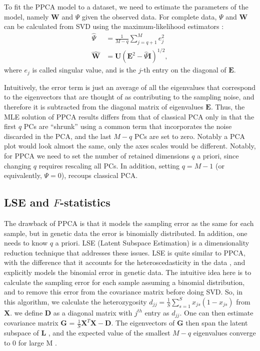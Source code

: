 \documentclass[12pt]{article}
\newcommand{\BI}{\mathbf{I}}
\newcommand{\MX}{\mathbf{X}}
\newcommand{\MG}{\mathbf{G}}
\begin{document}
To fit the PPCA model to a dataset, we need to estimate the parameters of the model, namely $\mathbf{W}$ and $\Psi$ given the observed data. For complete data, $\Psi$ and $\mathbf{W}$ can be calculated from SVD using the maximum-likelihood estimators \cite{tipping_probabilistic_1999}:
\begin{align*}
    \hat{\Psi} &= \frac{1}{M-q}\sum_{j=q+1}^M e_{j}^2\\
    \hat{\mathbf{W}} &= \mathbf{U}(\mathbf{E}^2 - \hat{\Psi}\BI)^{1/2},
\end{align*}
where $e_j$ is called singular value, and is the $j$-th entry on the diagonal of $\mathbf{E}$.

Intuitively, the error term is just an average of all the eigenvalues that correspond to the eigenvectors that are thought of as contributing to the sampling noise, and therefore it is subtracted from the diagonal matrix of eigenvalues $\mathbf{E}$. Thus, the MLE solution of PPCA results differs from that of classical PCA only in that the first $q$ PCs are ``shrunk'' using a common term that incorporates the noise discarded in the PCA, and the last $M-q$ PCs are set to zero. Notably a PCA plot would look almost the same, only the axes scales would be different. Notably, for PPCA we need to set the number of retained dimensions $q$ a priori, since changing $q$ requires rescaling all PCs. In addition, setting $q=M-1$ (or equivalently, $\Psi=0$), recoups classical PCA.


\subsection{LSE and $F$-statistics}\label{theory-lse}
The drawback of PPCA is that it models the sampling error as the same for each sample, but in genetic data the error is binomially distributed. In addition, one needs to know $q$ a priori. LSE (Latent Subspace Estimation) is a dimensionality reduction technique that addresses these issues. LSE is quite similar to PPCA, with the difference that it accounts for the heteroscedasticity in the data \citep{chen_consistent_2015}, and explicitly models the binomial error in genetic data. The intuitive idea here is to calculate the sampling error for each sample assuming a binomial distribution, and to remove this error from the covariance matrix before doing SVD. So, in this algorithm, we calculate the heterozygosity  $d_{jj} = \frac{1}{S}\sum_{s=1}^S x_{js}(1 - x_{js})$ from $\MX$. we define $\mathbf{D}$ as a diagonal matrix with $j^{th}$ entry as $d_{jj}$. One can then estimate covariance matrix $\MG$ = $\frac{1}{S}\MX^T\MX - \mathbf{D}$. The eigenvectors of $\mathbf{G}$ then span the latent subspace of $\mathbf{L}$ , and the expected value of the smallest $M-q$ eigenvalues converge to 0 for large M \citep{cabreros_likelihood-free_2019}.
\end{document}
